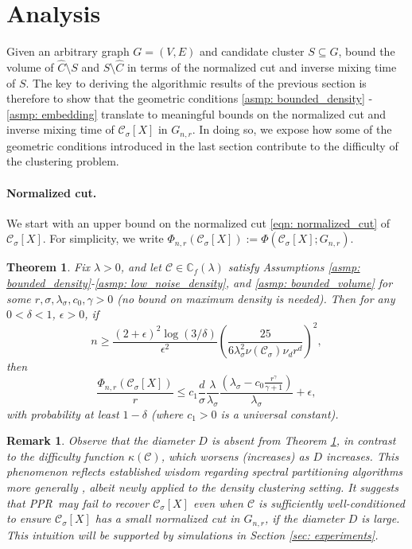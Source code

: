 \documentclass{article}
\newcommand{\1}{\mathbf{1}}
\newcommand{\Xbf}{X}             %
\newcommand{\Cbb}{\mathbb{C}}
\newcommand{\Cset}{\mathcal{C}}
\newcommand{\Csig}{\Cset_{\sigma}}
\newcommand{\Cest}{\widehat{C}}
\newcommand{\pprspace}{{\sc PPR~}}
\theoremstyle{aldenthm}
\newtheorem{theorem}{Theorem}
\theoremstyle{aldenrmrk}
\newtheorem{remark}{Remark}
\begin{document}
\section{Analysis}
\label{sec: analysis}

Given an arbitrary graph $G = (V,E)$ and candidate cluster $S \subseteq G$, \citet{zhu2013} bound the volume of $\Cest \setminus S$ and $S \setminus \Cest$ in terms of the normalized cut and inverse mixing time of $S$. The key to deriving the algorithmic results of the previous section is therefore to show that the geometric conditions \ref{asmp: bounded_density} - \ref{asmp: embedding} translate to meaningful bounds on the normalized cut and inverse mixing time of $\Csig[\Xbf]$ in $G_{n,r}$. In doing so, we expose how some of the geometric conditions introduced in the last section contribute to the difficulty of the clustering problem.

\paragraph{Normalized cut.} We start with an upper bound on the normalized cut \eqref{eqn: normalized_cut} of 
$\Cset_\sigma[\Xbf]$. For simplicity, we write $\Phi_{n,r}(\Csig[\Xbf]) := \Phi(\Csig[\Xbf]; G_{n,r})$.

\begin{theorem}
	\label{thm: conductance_upper_bound}
	Fix $\lambda > 0$, and let $\Cset \in \Cbb_f(\lambda)$ satisfy
	Assumptions \ref{asmp: bounded_density}-\ref{asmp: low_noise_density}, and \ref{asmp: bounded_volume} for some 
	$r, \sigma, \lambda_{\sigma}, c_0, \gamma > 0$ (no bound on maximum density is needed). 
	Then for any $0 < \delta < 1$, $\epsilon > 0$, if
	\begin{equation}
	\label{eqn: conductance_sample_complexity}
	n \geq \frac{(2+\epsilon)^2\log(3/\delta)}{\epsilon^2}\left(\frac{25}
	{6 \lambda_{\sigma}^2\nu(\Csig) \nu_d r^d}\right)^2,
	\end{equation}
	then
	\begin{equation}
	\label{eqn: conductance_additive_error_bound}
	\frac{\Phi_{n,r}(\Csig[\Xbf])}{r} \leq c_1 \frac{d}{\sigma}
	\frac{\lambda}{\lambda_{\sigma}} \frac{(\lambda_{\sigma} -
		c_0\frac{r^{\gamma}}{\gamma+1})}{\lambda_{\sigma}} + \epsilon, 
	\end{equation}
	with probability at least $1-\delta$ (where $c_1 > 0$ is a universal constant).
\end{theorem}

\begin{remark}
	Observe that the diameter $D$ is absent from Theorem \ref{thm: conductance_upper_bound}, in contrast to the difficulty function $\kappa(\Cset)$, which worsens (increases) as $D$ increases. This phenomenon reflects established wisdom regarding spectral partitioning algorithms more generally \cite{guattery1995, hein2010}, albeit newly applied to the density clustering setting. It suggests that \pprspace may fail to recover $\Csig[\Xbf]$ even when $\Cset$ is sufficiently well-conditioned to ensure $\Csig[\Xbf]$ has a small normalized cut in $G_{n,r}$, if the diameter $D$ is large. This intuition will be supported by simulations in Section \ref{sec: experiments}.
\end{remark}
\end{document}
